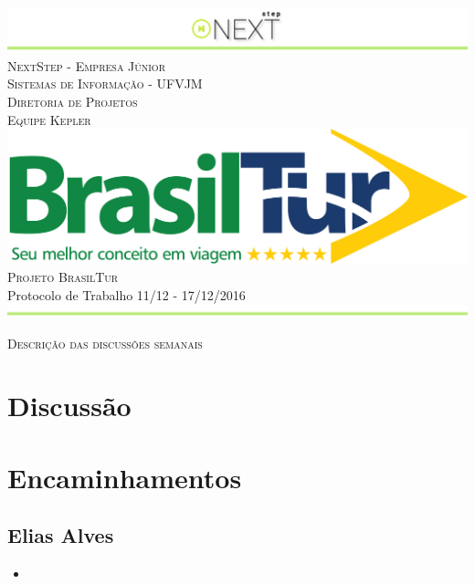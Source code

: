 \documentclass[a4paper, 12pt]{article}
\newcommand\semana{11/12 - 17/12/2016}
\newcommand\equipe{Equipe Kepler}
\newcommand\projeto{Projeto BrasilTur}
\newcommand\titulo{Protocolo de Trabalho \semana}
\begin{document}
\begin{titlepage}

\begin{center}
\includegraphics[width=\linewidth]{../../images/next_step_logo.png} \\[0.8cm]
\textsc{\LARGE NextStep - Empresa Júnior} \\[0.2cm]
\textsc{\LARGE Sistemas de Informação - UFVJM} \\[0.2cm]
\textsc{\LARGE Diretoria de Projetos} \\[0.2cm]
\textsc{\equipe} \\[1.3cm]
\vfill
\includegraphics[width=0.3\linewidth]{../../../img/brtur1.png} \\[0.8cm]
\textsc{\LARGE \projeto} \\[0.8cm]
\vfill
\vfill
{\LARGE \titulo \\[0.4cm]}
\includegraphics[width=\linewidth]{../../images/jc_rodape.png} \\[0.8cm]
\end{center}
\end{titlepage}
\clearpage

\begin{center}
\textsc{\LARGE Descrição das discussões semanais} \\[0.2cm]
\end{center}
\section*{Discussão}


\section*{Encaminhamentos}


\subsection*{Elias Alves}
\begin{itemize}
	\item 
\end{itemize}
\end{document}
